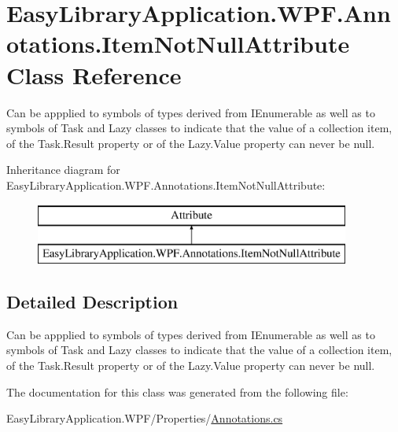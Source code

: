 \hypertarget{class_easy_library_application_1_1_w_p_f_1_1_annotations_1_1_item_not_null_attribute}{}\section{Easy\+Library\+Application.\+W\+P\+F.\+Annotations.\+Item\+Not\+Null\+Attribute Class Reference}
\label{class_easy_library_application_1_1_w_p_f_1_1_annotations_1_1_item_not_null_attribute}


Can be appplied to symbols of types derived from I\+Enumerable as well as to symbols of Task and Lazy classes to indicate that the value of a collection item, of the Task.\+Result property or of the Lazy.\+Value property can never be null.  


Inheritance diagram for Easy\+Library\+Application.\+W\+P\+F.\+Annotations.\+Item\+Not\+Null\+Attribute\+:\begin{figure}[H]
\begin{center}
\leavevmode
\includegraphics[height=2.000000cm]{class_easy_library_application_1_1_w_p_f_1_1_annotations_1_1_item_not_null_attribute}
\end{center}
\end{figure}


\subsection{Detailed Description}
Can be appplied to symbols of types derived from I\+Enumerable as well as to symbols of Task and Lazy classes to indicate that the value of a collection item, of the Task.\+Result property or of the Lazy.\+Value property can never be null. 



The documentation for this class was generated from the following file\+:\begin{DoxyCompactItemize}
\item 
Easy\+Library\+Application.\+W\+P\+F/\+Properties/\mbox{\hyperlink{_annotations_8cs}{Annotations.\+cs}}\end{DoxyCompactItemize}
